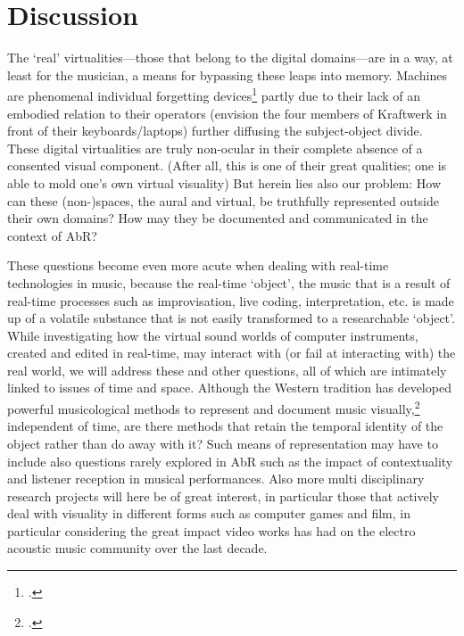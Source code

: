 
\section*{Discussion}
\label{sec:discussion}

The `real' virtualities---those that belong to the digital domains---are in a way, at least for the musician, a means for bypassing these leaps into memory. Machines are phenomenal individual forgetting devices\footcite[See][]{miller04} partly due to their lack of an embodied relation to their operators (envision the four members of Kraftwerk in front of their keyboards/laptops) further diffusing the subject-object divide. These digital virtualities are truly non-ocular in their complete absence of a consented visual component. (After all, this is one of their great qualities; one is able to mold one's own virtual visuality) But herein lies also our problem: 
How can these (non-)spaces, the aural and virtual, be truthfully represented outside their own domains? How may they be documented and communicated in the context of AbR?

These questions become even more acute when dealing with real-time technologies in music, because the real-time `object', the music that is a result of real-time processes such as improvisation, live coding, interpretation, etc. is made up of a volatile substance that is not easily transformed to a researchable `object'. While investigating how the virtual sound worlds of computer instruments, created and edited in real-time, may interact with (or fail at interacting with) the real world, we will address these and other questions, all of which are intimately linked to issues of time and space. Although the Western tradition has developed powerful musicological methods to represent and document music visually,\footcite[See]{bregman94} independent of time, are there methods that retain the temporal identity of the object rather than do away with it? Such means of representation may have to include also questions rarely explored in AbR such as the impact of contextuality and listener reception in musical performances. Also more multi disciplinary research projects will here be of great interest, in particular those that actively deal with visuality in different forms such as computer games and film, in particular considering the great impact video works has had on the electro acoustic music community over the last decade.

